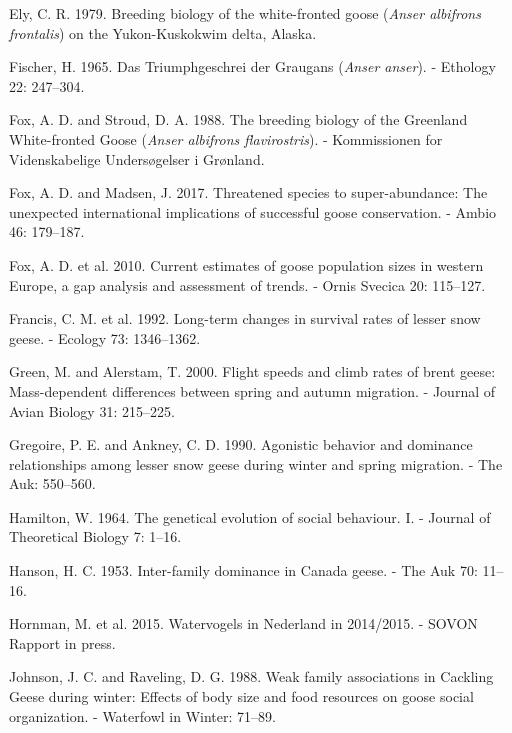 \documentclass[10pt,twocolumn]{paper}
\begin{document}
\hypertarget{ref-ely1979breeding}{}
Ely, C. R. 1979. Breeding biology of the white-fronted goose
(\emph{Anser albifrons frontalis}) on the Yukon-Kuskokwim delta, Alaska.

\hypertarget{ref-fischer1965triumphgeschrei}{}
Fischer, H. 1965. Das Triumphgeschrei der Graugans (\emph{Anser anser}).
- Ethology 22: 247--304.

\hypertarget{ref-fox1988breeding}{}
Fox, A. D. and Stroud, D. A. 1988. The breeding biology of the Greenland
White-fronted Goose (\emph{Anser albifrons flavirostris}). -
Kommissionen for Videnskabelige Undersøgelser i Grønland.

\hypertarget{ref-Fox2017a}{}
Fox, A. D. and Madsen, J. 2017. Threatened species to super-abundance:
The unexpected international implications of successful goose
conservation. - Ambio 46: 179--187.

\hypertarget{ref-fox2010current}{}
Fox, A. D. et al. 2010. Current estimates of goose population sizes in
western Europe, a gap analysis and assessment of trends. - Ornis Svecica
20: 115--127.

\hypertarget{ref-francis1992survival}{}
Francis, C. M. et al. 1992. Long-term changes in survival rates of
lesser snow geese. - Ecology 73: 1346--1362.

\hypertarget{ref-JAV:JAV310213}{}
Green, M. and Alerstam, T. 2000. Flight speeds and climb rates of brent
geese: Mass-dependent differences between spring and autumn migration. -
Journal of Avian Biology 31: 215--225.

\hypertarget{ref-gregoire1990agonistic}{}
Gregoire, P. E. and Ankney, C. D. 1990. Agonistic behavior and dominance
relationships among lesser snow geese during winter and spring
migration. - The Auk: 550--560.

\hypertarget{ref-HAMILTON19641}{}
Hamilton, W. 1964. The genetical evolution of social behaviour. I. -
Journal of Theoretical Biology 7: 1--16.

\hypertarget{ref-hanson1953dominance}{}
Hanson, H. C. 1953. Inter-family dominance in Canada geese. - The Auk
70: 11--16.

\hypertarget{ref-sovon2015watervogels}{}
Hornman, M. et al. 2015. Watervogels in Nederland in 2014/2015. - SOVON
Rapport in press.

\hypertarget{ref-johnson1988weak}{}
Johnson, J. C. and Raveling, D. G. 1988. Weak family associations in
Cackling Geese during winter: Effects of body size and food resources on
goose social organization. - Waterfowl in Winter: 71--89.
\end{document}
